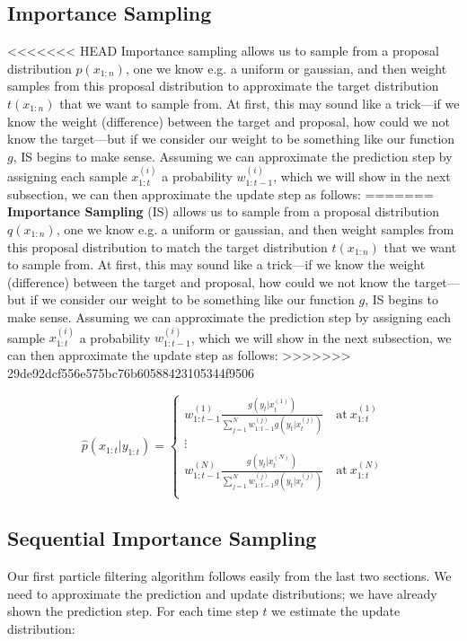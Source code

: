 \documentclass{article}
\begin{document}
\subsection{Importance Sampling}
<<<<<<< HEAD
Importance sampling allows us to sample from a proposal distribution $p(x_{1:n})$, one we know e.g. a uniform or gaussian, and then weight samples from this proposal distribution to approximate the target distribution $t(x_{1:n})$ that we want to sample from. At first, this may sound like a trick---if we know the weight (difference) between the target and proposal, how could we not know the target---but if we consider our weight to be something like our function $g$, IS begins to make sense. Assuming we can approximate the prediction step by assigning each sample $x_{1:t}^{(i)}$ a probability $w_{1:t-1}^{(i)}$, which we will show in the next subsection, we can then approximate the update step as follows:
=======
\textbf{Importance Sampling} (IS) allows us to sample from a proposal distribution $q(x_{1:n})$, one we know e.g. a uniform or gaussian, and then weight samples from this proposal distribution to match the target distribution $t(x_{1:n})$ that we want to sample from. At first, this may sound like a trick---if we know the weight (difference) between the target and proposal, how could we not know the target---but if we consider our weight to be something like our function $g$, IS begins to make sense. Assuming we can approximate the prediction step by assigning each sample $x_{1:t}^{(i)}$ a probability $w_{1:t-1}^{(i)}$, which we will show in the next subsection, we can then approximate the update step as follows:
>>>>>>> 29de92dcf556e575bc76b60588423105344f9506

\begin{equation}
\widehat{p}(x_{1:t}|y_{1:t}) = \begin{cases}
w_{1:t-1}^{(1)}\frac{g(y_{t}|x_{t}^{(1)})}{\sum_{j=1}^N w_{1:t-1}^{(j)}g(y_{t}|x_{t}^{(j)})} \quad \text{at} \ x_{1:t}^{(1)} \\
\vdots \\
w_{1:t-1}^{(N)}\frac{g(y_{t}|x_{t}^{(N)})}{\sum_{j=1}^N w_{1:t-1}^{(j)}g(y_{t}|x_{t}^{(j)})} \quad \text{at} \ x_{1:t}^{(N)} \\
\end{cases}
\end{equation}

\subsection{Sequential Importance Sampling}
Our first particle filtering algorithm follows easily from the last two sections. We need to approximate the prediction and update distributions; we have already shown the prediction step. For each time step $t$ we estimate the update distribution:
\end{document}
